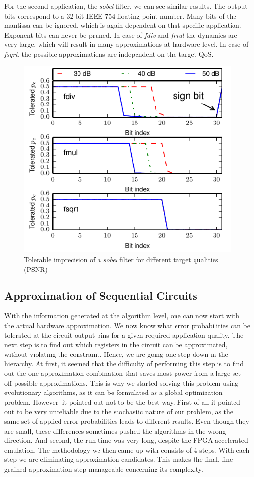 \documentclass[conference]{IEEEtran}
\begin{document}
For the second application, the \emph{sobel} filter, we can see similar results. The output bits correspond to a 32-bit IEEE 754 floating-point number. Many bits of the mantissa can be ignored, which is again dependent on that specific application. Exponent bits can never be pruned. In case of \emph{fdiv} and \emph{fmul} the dynamics are very large, which will result in many approximations at hardware level. In case of \emph{fsqrt}, the possible approximations are independent on the target QoS.
\begin{figure}[tb]
  \centering
  \includegraphics[width=.5\textwidth]{figs/metrics_sobel}
  \caption{Tolerable imprecision of a \emph{sobel} filter for different target qualities (PSNR)}
  \label{fig:metrics_sobel}
\end{figure}


\subsection{Approximation of Sequential Circuits}
\label{subsec:approximation}
With the information generated at the algorithm level, one can now start with the actual hardware approximation. We now know what error probabilities can be tolerated at the circuit output pins for a given required application quality. The next step is to find out which registers in the circuit can be approximated, without violating the constraint. Hence, we are going one step down in the hierarchy. At first, it seemed that the difficulty of performing this step is to find out the one approximation combination that saves most power from a large set off possible approximations. This is why we started solving this problem using evolutionary algorithms, as it can be formulated as a global optimization problem. However, it pointed out not to be the best way. First of all it pointed out to be very unreliable due to the stochastic nature of our problem, as the same set of applied error probabilities leads to different results. Even though they are small, these differences sometimes pushed the algorithms in the wrong direction. And second, the run-time was very long, despite the FPGA-accelerated emulation. The methodology we then came up with consists of 4 steps. With each step we are eliminating approximation candidates. This makes the final, fine-grained approximation step manageable concerning its complexity.
\end{document}
